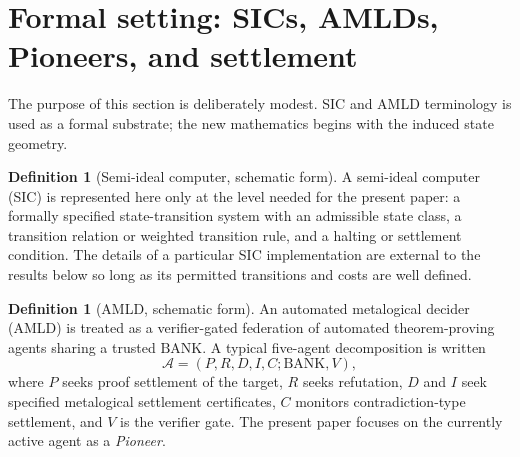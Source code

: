 \documentclass[11pt]{article}
\theoremstyle{definition}
\newtheorem{definition}[theorem]{Definition}
\theoremstyle{remark}
\newcommand{\BANK}{\mathrm{BANK}}
\begin{document}
\begin{abstract}
The resulting theory distinguishes lack of cartographic resolution from genuine geodesic branching. If multiple successors attain the same minimum continuation cost, no amount of refinement can make one intrinsically preferable unless new information changes the underlying state geometry. Conversely, when a unique continuation exists and the Omnicartographer's certified bounds converge to the true horizons, sufficiently high but finite resolution eventually certifies that continuation.

Finally, the paper examines the interaction between cartographic computation and Pioneer execution. Rather than requiring the Omnicartographer to construct a complete global map before movement begins, the proposed protocol refines only until the next move is certifiable, communicates that move immediately, and continues refining while the Pioneer executes verifier-safe transitions. This yields a real-time model of multiresolution theorem navigation in which geometry determines the geodesic, the Omnicartographer determines when the next geodesic move is knowable, the Pioneer converts certified local guidance into formal progress toward settlement, and the oracle layer is treated explicitly enough for its paradox-safety assumptions to be examined rather than merely presumed.
\end{abstract}

\tableofcontents
\newpage

\section{Formal setting: SICs, AMLDs, Pioneers, and settlement}
The purpose of this section is deliberately modest. SIC and AMLD terminology is used as a formal substrate; the new mathematics begins with the induced state geometry.

\begin{definition}[Semi-ideal computer, schematic form]
A semi-ideal computer (SIC) is represented here only at the level needed for the present paper: a formally specified state-transition system with an admissible state class, a transition relation or weighted transition rule, and a halting or settlement condition. The details of a particular SIC implementation are external to the results below so long as its permitted transitions and costs are well defined.
\end{definition}

\begin{definition}[AMLD, schematic form]
An automated metalogical decider (AMLD) is treated as a verifier-gated federation of automated theorem-proving agents sharing a trusted $\BANK$. A typical five-agent decomposition is written
\[
\mathcal A=(P,R,D,I,C;\BANK,V),
\]
where $P$ seeks proof settlement of the target, $R$ seeks refutation, $D$ and $I$ seek specified metalogical settlement certificates, $C$ monitors contradiction-type settlement, and $V$ is the verifier gate. The present paper focuses on the currently active agent as a \emph{Pioneer}.
\end{definition}
\end{document}
